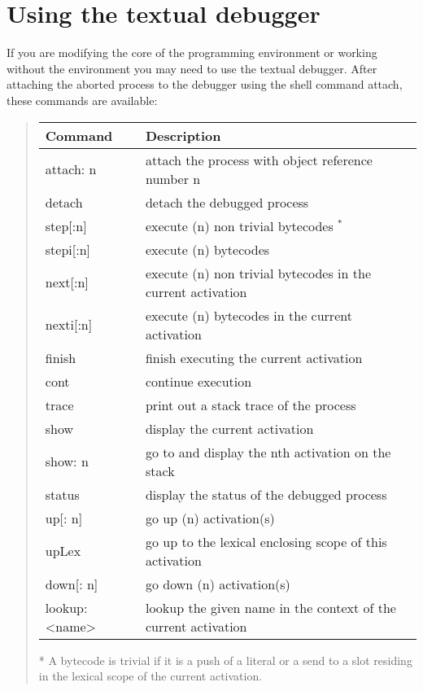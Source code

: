 \documentclass[letterpaper,10pt,english]{sphinxmanual}
\begin{document}
\section{Using the textual debugger}
\label{\detokenize{textdebug:using-the-textual-debugger}}\label{\detokenize{textdebug::doc}}
If you are modifying the core of the programming environment or working without the environment
you may need to use the textual debugger. After attaching the aborted process to the debugger
using the shell command attach, these commands are available:
\begin{quote}

\noindent\begin{tabulary}{\linewidth}{|L|L|}
\hline

Command
&
Description
\\
\hline
attach: n
&
attach the process with object reference number n
\\
\hline
detach
&
detach the debugged process
\\
\hline
step{[}:n{]}
&
execute (n) non trivial bytecodes $^{\text{*}}$
\\
\hline
stepi{[}:n{]}
&
execute (n) bytecodes
\\
\hline
next{[}:n{]}
&
execute (n) non trivial bytecodes in the current activation
\\
\hline
nexti{[}:n{]}
&
execute (n) bytecodes in the current activation
\\
\hline
finish
&
finish executing the current activation
\\
\hline
cont
&
continue execution
\\
\hline
trace
&
print out a stack trace of the process
\\
\hline
show
&
display the current activation
\\
\hline
show: n
&
go to and display the nth activation on the stack
\\
\hline
status
&
display the status of the debugged process
\\
\hline
up{[}: n{]}
&
go up (n) activation(s)
\\
\hline
upLex
&
go up to the lexical enclosing scope of this activation
\\
\hline
down{[}: n{]}
&
go down (n) activation(s)
\\
\hline
lookup: \textless{}name\textgreater{}
&
lookup the given name in the context of the current activation
\\
\hline\end{tabulary}


* A bytecode is trivial if it is a push of a literal or a send to a slot residing in
the lexical scope of the current activation.
\end{quote}
\end{document}
